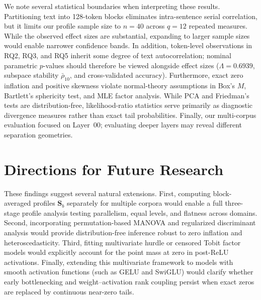 \documentclass[12pt, a4paper, oneside]{report}
\theoremstyle{definition}
\newcommand{\vect}[1]{\mathbf{#1}}
\begin{document}
We note several statistical boundaries when interpreting these results. Partitioning text into 128-token blocks eliminates intra-sentence serial correlation, but it limits our profile sample size to $n = 40$ across $q = 12$ repeated measures. While the observed effect sizes are substantial, expanding to larger sample sizes would enable narrower confidence bands. In addition, token-level observations in RQ2, RQ3, and RQ5 inherit some degree of text autocorrelation; nominal parametric $p$-values should therefore be viewed alongside effect sizes ($\Lambda = 0.6939$, subspace stability $\bar{\rho}_{10}$, and cross-validated accuracy). Furthermore, exact zero inflation and positive skewness violate normal-theory assumptions in Box's $M$, Bartlett's sphericity test, and MLE factor analysis. While PCA and Friedman's tests are distribution-free, likelihood-ratio statistics serve primarily as diagnostic divergence measures rather than exact tail probabilities. Finally, our multi-corpus evaluation focused on Layer~00; evaluating deeper layers may reveal different separation geometries.

\section{Directions for Future Research}

These findings suggest several natural extensions. First, computing block-averaged profiles $\vect{S}_b$ separately for multiple corpora would enable a full three-stage profile analysis testing parallelism, equal levels, and flatness across domains. Second, incorporating permutation-based MANOVA and regularized discriminant analysis would provide distribution-free inference robust to zero inflation and heteroscedasticity. Third, fitting multivariate hurdle or censored Tobit factor models would explicitly account for the point mass at zero in post-ReLU activations. Finally, extending this multivariate framework to models with smooth activation functions (such as GELU and SwiGLU) would clarify whether early bottlenecking and weight--activation rank coupling persist when exact zeros are replaced by continuous near-zero tails.
\end{document}
